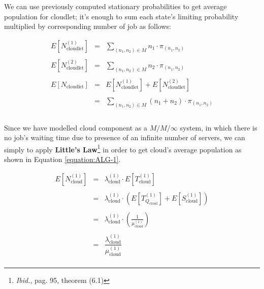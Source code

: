 \documentclass[10pt,a4paper]{article}
\begin{document}
We can use previously computed stationary probabilities to get average population for cloudlet; it's enough to sum each state's limiting probability multiplied by corresponding number of job as follows:

\begin{equation}
\label{eq:cloudletAveragePopulation}
\begin{array} {rcl} 
E[N_{\text{cloudlet}}^{(1)}] & = & \displaystyle \sum_{ (n_1, n_2) \in M} n_1 \cdot \pi_{(n_1,n_2)}  \\\\

E[N_{\text{cloudlet}}^{(2)}] & = & \displaystyle \sum_{ (n_1, n_2) \in M} n_2 \cdot \pi_{(n_1,n_2)}  \\\\

E[N_{\text{cloudlet}}] & = & E[N_{\text{cloudlet}}^{(1)}] + E[N_{\text{cloudlet}}^{(2)}] \\\\

& = & \displaystyle \sum_{ (n_1, n_2) \in M} (n_1 + n_2) \cdot \pi_{(n_1,n_2)} \\\\

\end{array}
\end{equation}

Since we have modelled cloud component as a $M/M/\infty$ system, in which there is no job's waiting time due to presence of an infinite number of servers, we can simply to apply \textbf{Little’s Law}\footnote{\textit{Ibid.}, pag. 95, theorem (6.1)} in order to get cloud's average population as shown in Equation \ref{equation:ALG-1}.

\begin{equation}
\label{eq:cloudAveragePopulation1}
\begin{array} {rcl} 
E[N_{\text{cloud}}^{(1)}] & = & \lambda_{\text{cloud}}^{(1)} \cdot E[T_{\text{cloud}}^{(1)}]  \\\\

& = & \lambda_{\text{cloud}}^{(1)} \cdot (E[T_{Q_{\text{cloud}}}^{(1)}] + E[S_{\text{cloud}}^{(1)}])  \\\\

& = & \lambda_{\text{cloud}}^{(1)} \cdot (\frac{1}{\mu_{\text{cloud}}^{(1)}}) \\\\

& = & \dfrac{\lambda_{\text{cloud}}^{(1)}}{\mu_{\text{cloud}}^{(1)}} \\

\end{array}
\end{equation}
\end{document}
